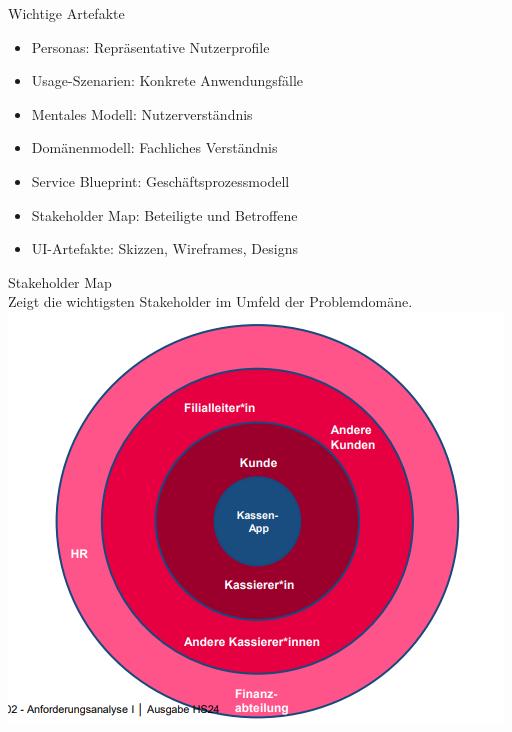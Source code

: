 \begin{corollary}{Wichtige Artefakte}
\begin{itemize}
    \item Personas: Repräsentative Nutzerprofile
    \item Usage-Szenarien: Konkrete Anwendungsfälle
    \item Mentales Modell: Nutzerverständnis
    \item Domänenmodell: Fachliches Verständnis
    \item Service Blueprint: Geschäftsprozessmodell
    \item Stakeholder Map: Beteiligte und Betroffene
    \item UI-Artefakte: Skizzen, Wireframes, Designs
\end{itemize}
\end{corollary}

\begin{example2}{Stakeholder Map}\\
Zeigt die wichtigsten Stakeholder im Umfeld der Problemdomäne.\\
\includegraphics[width=0.8\linewidth]{images/stakeholdermap.png}
\end{example2}

